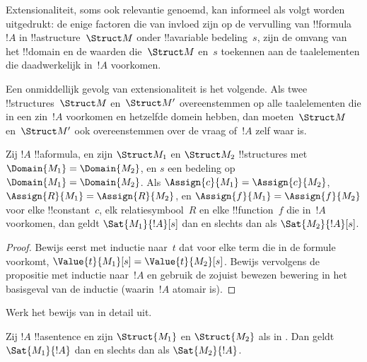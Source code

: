 \documentclass[../../../include/open-logic-section]{subfiles}
\begin{document}


\begin{explain}
Extensionaliteit, soms ook relevantie genoemd, kan informeel als
volgt worden uitgedrukt: de enige factoren die van invloed zijn op de
vervulling van !!{formula}~$!A$ in !!a{structure}~$\Struct M$ onder
!!a{variable} bedeling~$s$, zijn de omvang van het !!{domain} en de
waarden die~$\Struct M$ en~$s$ toekennen aan de taalelementen die
daadwerkelijk in~$!A$ voorkomen.

Een onmiddellijk gevolg van extensionaliteit is het volgende. Als twee
!!{structure}s~$\Struct M$ en~$\Struct M'$ overeenstemmen op alle
taalelementen die in een zin~$!A$ voorkomen en hetzelfde domein hebben,
dan moeten~$\Struct M$ en~$\Struct M'$ ook overeenstemmen over de vraag
of~$!A$ zelf waar is.
\end{explain}

\begin{prop}[Extensionaliteit]
  Zij $!A$ !!a{formula}, en zijn $\Struct M_1$ en $\Struct M_2$
  !!{structure}s met $\Domain{M_1} = \Domain{M_2}$, en $s$ een
  bedeling op $\Domain{M_1} = \Domain{M_2}$. Als
  $\Assign{c}{M_1} = \Assign{c}{M_2}$, $\Assign{R}{M_1}=\Assign{R}{M_2}$,
  en $\Assign{f}{M_1} = \Assign{f}{M_2}$ voor elke !!{constant}~$c$,
  elk relatiesymbool~$R$ en elke !!{function}~$f$ die in~$!A$
  voorkomen, dan geldt $\Sat{M_1}{!A}[s]$ dan en slechts dan als
  $\Sat{M_2}{!A}[s]$.
\end{prop}

\begin{proof}
  Bewijs eerst met inductie naar~$t$ dat voor elke term die in de
  formule voorkomt, $\Value{t}{M_1}[s] = \Value{t}{M_2}[s]$. Bewijs vervolgens
  de propositie met inductie naar~$!A$ en gebruik de zojuist bewezen
  bewering in het basisgeval van de inductie (waarin~$!A$ atomair is).
\end{proof}

\begin{prob}
Werk het bewijs van 
in detail uit.
\end{prob}

\begin{cor}
  Zij $!A$ !!a{sentence} en zijn $\Struct{M_1}$ en $\Struct{M_2}$ als in
  . Dan geldt $\Sat{M_1}{!A}$ dan en slechts
  dan als $\Sat{M_2}{!A}$.
\end{cor}
\end{document}
